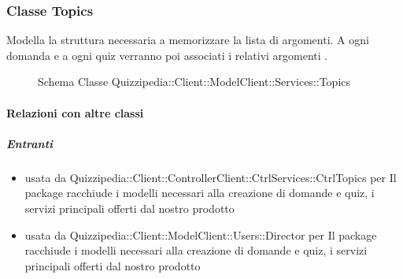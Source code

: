\subsubsection{Classe Topics}
Modella la struttura necessaria a memorizzare la lista di argomenti. A ogni domanda e a ogni quiz verranno poi associati i relativi argomenti .
\begin{figure}[H]
\centering
\noindent{}
\caption[Schema Classe Topics]{Schema Classe Quizzipedia::Client::ModelClient::Services::Topics}
\end{figure}
\paragraph{Relazioni con altre classi}
\subparagraph{Entranti}
\begin{itemize}
\item usata da Quizzipedia::Client::ControllerClient::CtrlServices::CtrlTopics per Il package racchiude i modelli necessari alla creazione di domande e quiz, i servizi principali offerti dal nostro prodotto
\item usata da Quizzipedia::Client::ModelClient::Users::Director per Il package racchiude i modelli necessari alla creazione di domande e quiz, i servizi principali offerti dal nostro prodotto
\end{itemize}
